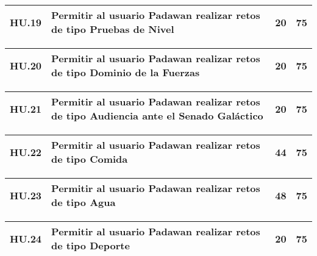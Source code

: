 \begin{table}[h]
	\centering
	\begin{tabular}{| p{2.3cm} | p{5.1cm} | p{2cm} | p{1.6cm} |}
		\hline 
		HU.19 & Permitir al usuario Padawan realizar retos de tipo Pruebas de Nivel & 20 & 75 \\ \hline 
	\end{tabular}
\end{table}   

\begin{table}[h]
	\centering
	\begin{tabular}{| p{2.3cm} | p{5.1cm} | p{2cm} | p{1.6cm} |}
		\hline 
		HU.20 & Permitir al usuario Padawan realizar retos de tipo Dominio de la Fuerzas & 20 & 75 \\ \hline 
	\end{tabular}
\end{table}   

\begin{table}[h]
	\centering
	\begin{tabular}{| p{2.3cm} | p{5.1cm} | p{2cm} | p{1.6cm} |}
		\hline 
		HU.21 & Permitir al usuario Padawan realizar retos de tipo Audiencia ante el Senado Galáctico & 20 & 75 \\ \hline 
	\end{tabular}
\end{table}

\begin{table}[h]
	\centering
	\begin{tabular}{| p{2.3cm} | p{5.1cm} | p{2cm} | p{1.6cm} |}
		\hline 
		HU.22 & Permitir al usuario Padawan realizar retos de tipo Comida & 44 & 75 \\ \hline 
	\end{tabular}
\end{table}

\begin{table}[h]
	\centering
	\begin{tabular}{| p{2.3cm} | p{5.1cm} | p{2cm} | p{1.6cm} |}
		\hline 
		HU.23 & Permitir al usuario Padawan realizar retos de tipo Agua & 48 & 75 \\ \hline 
	\end{tabular}
\end{table}

\begin{table}[h]
	\centering
	\begin{tabular}{| p{2.3cm} | p{5.1cm} | p{2cm} | p{1.6cm} |}
		\hline 
		HU.24 & Permitir al usuario Padawan realizar retos de tipo Deporte & 20 & 75 \\ \hline 
	\end{tabular}
\end{table}

